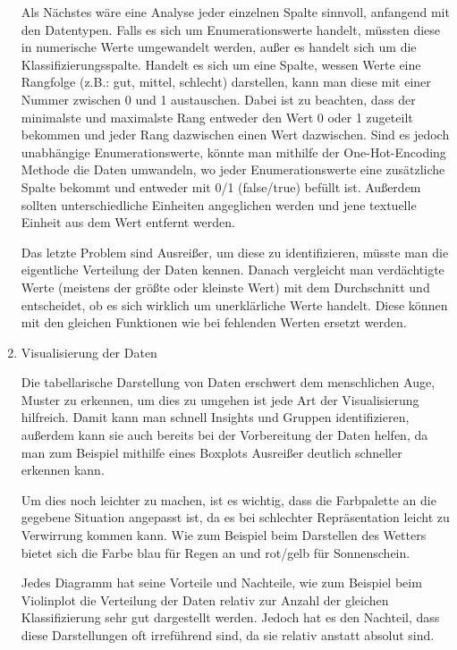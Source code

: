 \begin{enumerate}
            Als Nächstes wäre eine Analyse jeder einzelnen Spalte sinnvoll, anfangend mit den Datentypen. Falls es sich um Enumerationswerte handelt, müssten diese in numerische Werte umgewandelt werden, außer es handelt sich um die Klassifizierungsspalte. Handelt es sich um eine Spalte, wessen Werte eine Rangfolge (z.B.: gut, mittel, schlecht) darstellen, kann man diese mit einer Nummer zwischen 0 und 1 austauschen. Dabei ist zu beachten, dass der minimalste und maximalste Rang entweder den Wert 0 oder 1 zugeteilt bekommen und jeder Rang dazwischen einen Wert dazwischen. Sind es jedoch unabhängige Enumerationswerte, könnte man mithilfe der One-Hot-Encoding Methode die Daten umwandeln, wo jeder Enumerationswerte eine zusätzliche Spalte bekommt und entweder mit 0/1 (false/true) befüllt ist. Außerdem sollten unterschiedliche Einheiten angeglichen werden und jene textuelle Einheit aus dem Wert entfernt werden.

            Das letzte Problem sind Ausreißer, um diese zu identifizieren, müsste man die eigentliche Verteilung der Daten kennen. Danach vergleicht man verdächtigte Werte (meistens der größte oder kleinste Wert) mit dem Durchschnitt und entscheidet, ob es sich wirklich um unerklärliche Werte handelt. Diese können mit den gleichen Funktionen wie bei fehlenden Werten ersetzt werden.

      \item Visualisierung der Daten

            Die tabellarische Darstellung von Daten erschwert dem menschlichen Auge, Muster zu erkennen, um dies zu umgehen ist jede Art der Visualisierung hilfreich. Damit kann man schnell Insights und Gruppen identifizieren, außerdem kann sie auch bereits bei der Vorbereitung der Daten helfen, da man zum Beispiel mithilfe eines Boxplots Ausreißer deutlich schneller erkennen kann.

            Um dies noch leichter zu machen, ist es wichtig, dass die Farbpalette an die gegebene Situation angepasst ist, da es bei schlechter Repräsentation leicht zu Verwirrung kommen kann. Wie zum Beispiel beim Darstellen des Wetters bietet sich die Farbe blau für Regen an und rot/gelb für Sonnenschein.

            Jedes Diagramm hat seine Vorteile und Nachteile, wie zum Beispiel beim Violinplot die Verteilung der Daten relativ zur Anzahl der gleichen Klassifizierung sehr gut dargestellt werden. Jedoch hat es den Nachteil, dass diese Darstellungen oft irreführend sind, da sie relativ anstatt absolut sind.


\end{enumerate}
